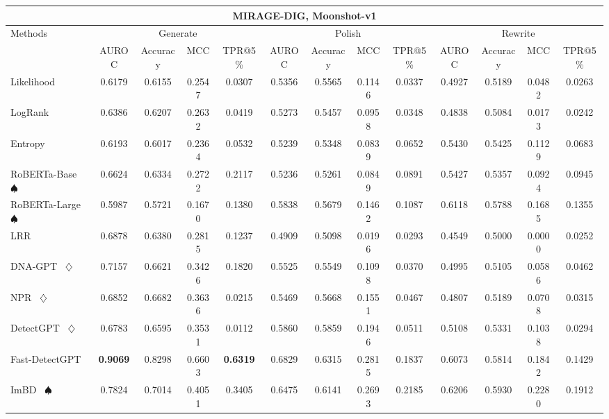 \begin{table*}[h]
{\begin{tabular}{l|cccc|cccc|cccc}
    \hline

    \hline
    \multicolumn{13}{c}{\textbf{MIRAGE-DIG, Moonshot-v1}}\\
    \hline

    \hline

    \hline
    \multirow{2}{*}{Methods}&\multicolumn{4}{c|}{Generate}&\multicolumn{4}{c|}{Polish}&\multicolumn{4}{c}{Rewrite} \\
    &  AUROC  &  Accuracy  &  MCC  &  TPR@5\%  &  AUROC  &  Accuracy  &  MCC  &  TPR@5\%  &  AUROC  &  Accuracy  &  MCC  &  TPR@5\%  \\
    \hline

    \hline
    Likelihood~\cite{likelihood} & 0.6179 & 0.6155 & 0.2547 & 0.0307 & 0.5356 & 0.5565 & 0.1146 & 0.0337 & 0.4927 & 0.5189 & 0.0482 & 0.0263 \\
    LogRank~\cite{logrank} & 0.6386 & 0.6207 & 0.2632 & 0.0419 & 0.5273 & 0.5457 & 0.0958 & 0.0348 & 0.4838 & 0.5084 & 0.0173 & 0.0242 \\
    Entropy~\cite{entropy} & 0.6193 & 0.6017 & 0.2364 & 0.0532 & 0.5239 & 0.5348 & 0.0839 & 0.0652 & 0.5430 & 0.5425 & 0.1129 & 0.0683 \\
    RoBERTa-Base~\cite{roberta} $\spadesuit$ & 0.6624 & 0.6334 & 0.2722 & 0.2117 & 0.5236 & 0.5261 & 0.0849 & 0.0891 & 0.5427 & 0.5357 & 0.0924 & 0.0945 \\
    RoBERTa-Large~\cite{roberta} $\spadesuit$ & 0.5987 & 0.5721 & 0.1670 & 0.1380 & 0.5838 & 0.5679 & 0.1462 & 0.1087 & 0.6118 & 0.5788 & 0.1685 & 0.1355 \\
    LRR~\cite{lrrandnpr} & 0.6878 & 0.6380 & 0.2815 & 0.1237 & 0.4909 & 0.5098 & 0.0196 & 0.0293 & 0.4549 & 0.5000 & 0.0000 & 0.0252 \\
    DNA-GPT~\cite{dna-gpt} $\diamondsuit$ & 0.7157 & 0.6621 & 0.3426 & 0.1820 & 0.5525 & 0.5549 & 0.1098 & 0.0370 & 0.4995 & 0.5105 & 0.0586 & 0.0462 \\
    NPR~\cite{lrrandnpr} $\diamondsuit$ & 0.6852 & 0.6682 & 0.3636 & 0.0215 & 0.5469 & 0.5668 & 0.1551 & 0.0467 & 0.4807 & 0.5189 & 0.0708 & 0.0315 \\
    DetectGPT~\cite{detectgpt} $\diamondsuit$ & 0.6783 & 0.6595 & 0.3531 & 0.0112 & 0.5860 & 0.5859 & 0.1946 & 0.0511 & 0.5108 & 0.5331 & 0.1038 & 0.0294 \\
    Fast-DetectGPT~\cite{fastdetectgpt} & \textbf{0.9069} & 0.8298 & 0.6603 & \textbf{0.6319} & 0.6829 & 0.6315 & 0.2815 & 0.1837 & 0.6073 & 0.5814 & 0.1842 & 0.1429 \\
    ImBD~\cite{imbd} $\spadesuit$ & 0.7824 & 0.7014 & 0.4051 & 0.3405 & 0.6475 & 0.6141 & 0.2693 & 0.2185 & 0.6206 & 0.5930 & 0.2280 & 0.1912 \\
    \hline
    

\end{tabular}}
\end{table*}
